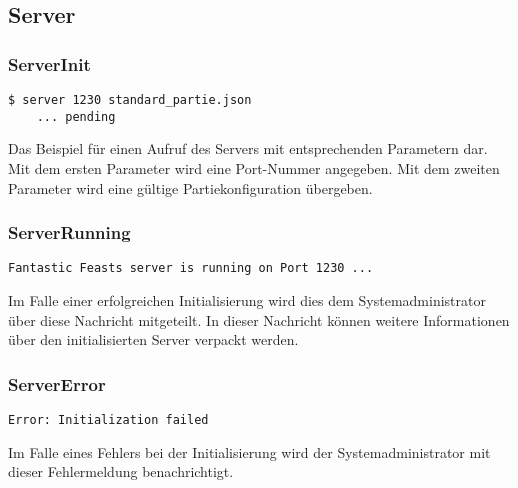 \subsection{Server}
	\subsubsection{ServerInit}
	\lstset{language=bash} 
	\begin{lstlisting}[frame=single]
  	$ server 1230 standard_partie.json
  	... pending
	\end{lstlisting}
	Das Beispiel für einen Aufruf des Servers mit entsprechenden Parametern dar. Mit dem ersten Parameter wird eine Port-Nummer angegeben. Mit dem zweiten Parameter wird eine gültige Partiekonfiguration übergeben.
	
	\subsubsection{ServerRunning}
	\lstset{language=bash} 
	\begin{lstlisting}[frame=single]
  	Fantastic Feasts server is running on Port 1230 ...
	\end{lstlisting}
	Im Falle einer erfolgreichen Initialisierung wird dies dem Systemadministrator über diese Nachricht mitgeteilt. In dieser Nachricht können weitere Informationen über den initialisierten Server verpackt werden.
	
	\subsubsection{ServerError}
	\lstset{language=bash} 
	\begin{lstlisting}[frame=single]
  	Error: Initialization failed
	\end{lstlisting}
	Im Falle eines Fehlers bei der Initialisierung wird der Systemadministrator mit dieser Fehlermeldung benachrichtigt.


